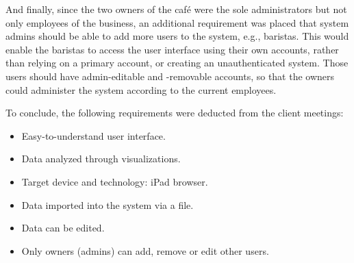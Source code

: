 And finally, since the two owners of the café were the sole administrators but not only employees of the business, an
additional requirement was placed that system admins should be able to add more users to the system, e.g., baristas.
This would enable the baristas to access the user interface using their own accounts, rather than relying on a primary
account, or creating an unauthenticated system.
Those users should have admin-editable and -removable accounts, so that the owners could administer the system according
to the current employees.

To conclude, the following requirements were deducted from the client meetings:
\begin{itemize}
    \item Easy-to-understand user interface.
    \item Data analyzed through visualizations.
    \item Target device and technology: iPad browser.
    \item Data imported into the system via a file.
    \item Data can be edited.
    \item Only owners (admins) can add, remove or edit other users.
\end{itemize}

